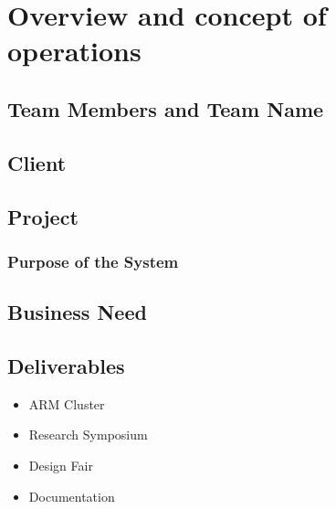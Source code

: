 

\chapter{Overview and concept of operations}


\section{Team Members and Team Name}


\section{Client}

\section{Project}

\subsection{Purpose of the System}


\section{Business Need}


\section{Deliverables}

\begin{itemize}
	\item ARM Cluster
	\item Research Symposium
	\item Design Fair
	\item Documentation
\end{itemize}

